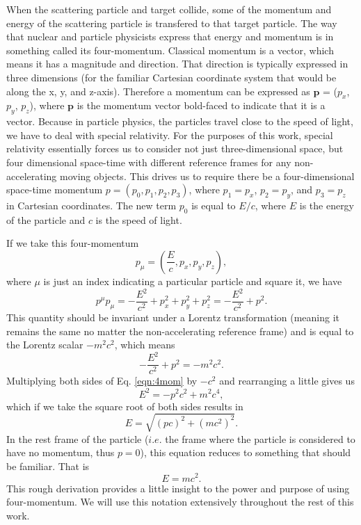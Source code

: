 When the scattering particle and target collide, some of the momentum and energy of the scattering particle is transfered to that target particle. The way that nuclear and particle physicists express that energy and momentum is in something called its four-momentum. Classical momentum is a vector, which means it has a magnitude and direction. That direction is typically expressed in three dimensions (for the familiar Cartesian coordinate system that would be along the x, y, and z-axis). Therefore a momentum can be expressed as $\mathbf{p}$ = ($p_x$, $p_y$, $p_z$), where $\mathbf{p}$ is the momentum vector bold-faced to indicate that it is a vector. Because in particle physics, the particles travel close to the speed of light, we have to deal with special relativity. For the purposes of this work, special relativity essentially forces us to consider not just three-dimensional space, but four dimensional space-time with different reference frames for any non-accelerating moving objects. This drives us to require there be a four-dimensional space-time momentum $p=(p_0,p_1,p_2,p_3)$, where $p_1=p_x$, $p_2=p_y$, and $p_3=p_z$ in Cartesian coordinates. The new term $p_0$ is equal to $E/c$, where $E$ is the energy of the particle and $c$ is the speed of light.

If we take this four-momentum
\begin{equation}
p_{\mu} = \left( \frac{E}{c}, p_x, p_y, p_z \right),
\end{equation} 
where $\mu$ is just an index indicating a particular particle and square it, we have
\begin{equation}
p^{\mu}p_{\mu} = -\frac{E^2}{c^2} + p^2_x +p^2_y + p^2_z = -\frac{E^2}{c^2} + p^2.
\end{equation}
This quantity should be invariant under a Lorentz transformation (meaning it remains the same no matter the non-accelerating reference frame) and is equal to the Lorentz scalar $-m^2c^2$, which means 
\begin{equation}
\label{eqn:4mom}
-\frac{E^2}{c^2} + p^2 = -m^2c^2.
\end{equation}
Multiplying both sides of Eq. \ref{eqn:4mom} by $-c^2$ and rearranging a little gives us
\begin{equation}
\label{eqn:e_squared}
E^2 = - p^2c^2 + m^2c^4,
\end{equation}
which if we take the square root of both sides results in
\begin{equation}
E=\sqrt{(pc)^2+(mc^2)^2}.
\end{equation}
In the rest frame of the particle ($i.e.$ the frame where the particle is considered to have no momentum, thus $p=0$), this equation reduces to something that should be familiar. That is
\begin{equation}
E=mc^2.
\end{equation}
This rough derivation provides a little insight to the power and purpose of using four-momentum. We will use this notation extensively throughout the rest of this work. 

